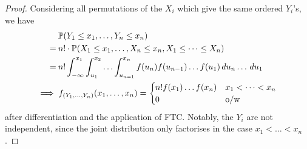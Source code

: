 \documentclass{../template/note}
\begin{document}
    \begin{proof}
        Considering all permutations of the \(X_i\) which give the same ordered \(Y_i\)'s, we have
        \begin{align*}
            &\:\mathbb P(Y_1 \leq x_1, \dots, Y_n \leq x_n) \\ =&\: n! \cdot \mathbb P(X_1 \leq x_1, \dots, X_n \leq x_n, X_1 \leq \dots \leq X_n) \\
            =&\: n! \int_{-\infty}^{x_1} \int_{u_1}^{x_2} \dots \int_{u_{n=1}}^{x_n} f(u_n)f(u_{n-1})\dots f(u_1) \,d{u}_n \dots \,d{u}_1 \\
            \implies &\; f_{(Y_1, \dots, Y_n)}(x_1, \dots, x_n) = \begin{cases}
                n!f(x_1) \dots f(x_n) & x_1 < \dots < x_n \\
                0 & \text{o/w}
            \end{cases}
        \end{align*}
        after differentiation and the application of FTC. Notably, the \(Y_i\) are not independent, since the joint distribution only factorises in the case \(x_1 < \dots < x_n\).      
    \end{proof}
\end{document}
